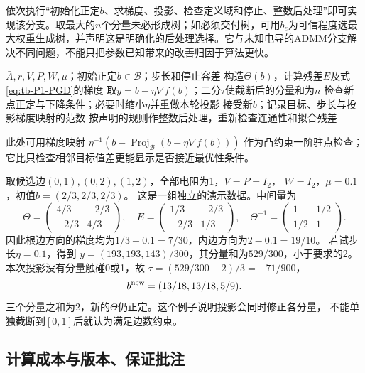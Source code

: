 依次执行“初始化正定$b$、求梯度、投影、检查定义域和停止、整数后处理”即可实现该分支。取最大的$n$个分量未必形成树；如必须交付树，可用$b_e$为可信程度选最大权重生成树，并声明这是明确化的后处理选择。它与未知电导的ADMM分支解决不同问题，不能只把参数已知带来的改善归因于算法更快。


\begin{algorithm}[htbp]
\caption{P1已知电阻分支：投影梯度与教材的定义域检查}
\label{alg:tb-P1-PGD}
\begin{algorithmic}[1]
\Require $\bar A,r,V,P,W,\mu$；初始正定$b\in\mathcal B$；步长和停止容差
\Repeat
 \State 构造$\Theta(b)$，计算残差$E$及式\eqref{eq:tb-P1-PGD}的梯度
 \State 取$y=b-\eta\nabla f(b)$；二分$\tau$使截断后的分量和为$n$
 \State 检查新点正定与下降条件；必要时缩小$\eta$并重做本轮投影
 \State 接受新$b$；记录目标、步长与投影梯度映射的范数
\State 按声明的规则作整数后处理，重新检查连通性和拟合残差
\end{algorithmic}
\end{algorithm}
此处可用梯度映射
$\eta^{-1}(b-\operatorname{Proj}_{\mathcal B}(b-\eta\nabla f(b)))$
作为凸约束一阶驻点检查；它比只检查相邻目标值差更能显示是否接近最优性条件。

\begin{example}
取候选边$(0,1),(0,2),(1,2)$，全部电阻为1，$V=P=I_2$，
$W=I_2$，$\mu=0.1$，初值$b=(2/3,2/3,2/3)$。
这是一组独立的演示数据。中间量为
\[
 \Theta=\begin{pmatrix}4/3&-2/3\\-2/3&4/3\end{pmatrix},\quad
 E=\begin{pmatrix}1/3&-2/3\\-2/3&1/3\end{pmatrix},\quad
 \Theta^{-1}=\begin{pmatrix}1&1/2\\1/2&1\end{pmatrix}.
\]
因此根边方向的梯度均为$1/3-0.1=7/30$，内边方向为$2-0.1=19/10$。
若试步长$\eta=0.1$，得到
$y=(193,193,143)/300$，其分量和为$529/300$，小于要求的2。
本次投影没有分量触碰0或1，故
$\tau=(529/300-2)/3=-71/900$，
\[
 b^{\rm new}=(13/18,13/18,5/9).
\]
三个分量之和为2，新的$\Theta$仍正定。这个例子说明投影会同时修正各分量，
不能单独截断到$[0,1]$后就认为满足边数约束。
\end{example}

\subsection{计算成本与版本、保证批注}

